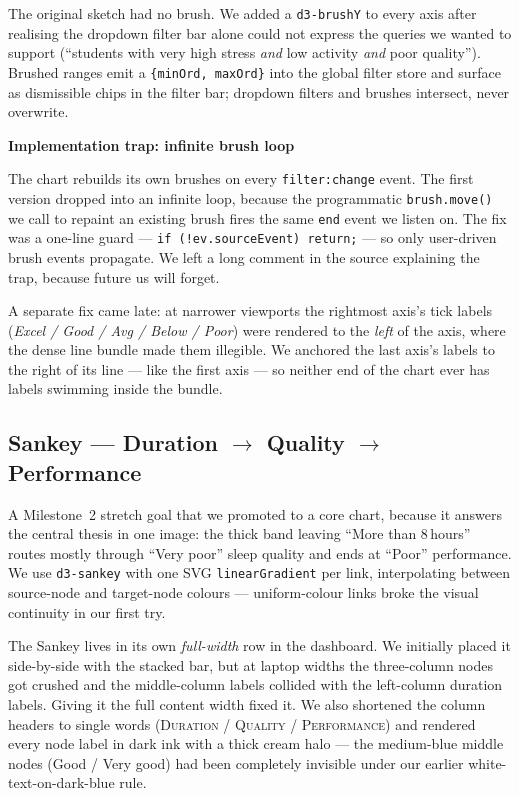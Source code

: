 \documentclass[11pt,a4paper]{article}
\newcommand{\code}[1]{\texttt{\small #1}}
\begin{document}
The original sketch had no brush. We added a \code{d3-brushY} to every axis after realising the dropdown filter bar alone could not express the queries we wanted to support (``students with very high stress \emph{and} low activity \emph{and} poor quality''). Brushed ranges emit a \code{\{minOrd, maxOrd\}} into the global filter store and surface as dismissible chips in the filter bar; dropdown filters and brushes intersect, never overwrite.

\begin{tcolorbox}[colback=white,colframe=teal,leftrule=2pt,sharp corners,
                  before skip=4pt,after skip=4pt]
{\sffamily\bfseries\color{teal}Implementation trap: infinite brush loop}\par\smallskip
The chart rebuilds its own brushes on every \code{filter:change} event. The first version dropped into an infinite loop, because the programmatic \code{brush.move()} we call to repaint an existing brush fires the same \code{end} event we listen on. The fix was a one-line guard — \code{if (!ev.sourceEvent) return;} — so only user-driven brush events propagate. We left a long comment in the source explaining the trap, because future us will forget.
\end{tcolorbox}

A separate fix came late: at narrower viewports the rightmost axis's tick labels (\emph{Excel / Good / Avg / Below / Poor}) were rendered to the \emph{left} of the axis, where the dense line bundle made them illegible. We anchored the last axis's labels to the right of its line — like the first axis — so neither end of the chart ever has labels swimming inside the bundle.

\subsection{Sankey — Duration $\to$ Quality $\to$ Performance}

A Milestone~2 stretch goal that we promoted to a core chart, because it answers the central thesis in one image: the thick band leaving ``More than 8\,hours'' routes mostly through ``Very poor'' sleep quality and ends at ``Poor'' performance. We use \code{d3-sankey} with one SVG \code{linearGradient} per link, interpolating between source-node and target-node colours — uniform-colour links broke the visual continuity in our first try.

The Sankey lives in its own \emph{full-width} row in the dashboard. We initially placed it side-by-side with the stacked bar, but at laptop widths the three-column nodes got crushed and the middle-column labels collided with the left-column duration labels. Giving it the full content width fixed it. We also shortened the column headers to single words (\textsc{Duration / Quality / Performance}) and rendered every node label in dark ink with a thick cream halo — the medium-blue middle nodes (Good / Very good) had been completely invisible under our earlier white-text-on-dark-blue rule.
\end{document}
